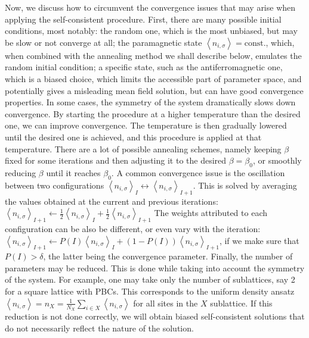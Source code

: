 Now, we discuss how to circumvent the convergence issues that may arise when applying the self-consistent procedure.
First, there are many possible initial conditions, most notably: the random one, which is the most unbiased, but may be slow or not converge at all; the paramagnetic state $\left\langle n_{i,\sigma} \right\rangle = \text{const.}$, which, when combined with the annealing method we shall describe below, emulates the random initial condition; a specific state, such as the antiferromagnetic one, which is a biased choice, which limits the accessible part of parameter space, and potentially gives a misleading mean field solution, but can have good convergence properties.
In some cases, the symmetry of the system dramatically slows down convergence.
By starting the procedure at a higher temperature than the desired one, we can improve convergence.
The temperature is then gradually lowered until the desired one is achieved, and this procedure is applied at that temperature.
There are a lot of possible annealing schemes, namely keeping $\beta$ fixed for some iterations and then adjusting it to the desired $\beta = \beta_0$, or smoothly reducing $\beta$ until it reaches $\beta_0$.
A common convergence issue is the oscillation between two configurations $\left\langle n_{i,\sigma}\right\rangle_I \leftrightarrow \left\langle n_{i,\sigma}\right\rangle_{I+1}$.
This is solved by averaging the values obtained at the current and previous iterations: $\left\langle n_{i,\sigma}\right\rangle_{I+1} \leftarrow \frac{1}{2} \left\langle n_{i,\sigma}\right\rangle_I + \frac{1}{2} \left\langle n_{i,\sigma}\right\rangle_{I+1}$
The weights attributed to each configuration can be also be different, or even vary with the iteration: $\left\langle n_{i,\sigma}\right\rangle_{I+1} \leftarrow P(I) \left\langle n_{i,\sigma}\right\rangle_I + (1 - P(I) ) \left\langle n_{i,\sigma}\right\rangle_{I+1}$, if we make sure that $P(I) > \delta$, the latter being the convergence parameter.
Finally, the number of parameters may be reduced.
This is done while taking into account the symmetry of the system.
For example, one may take only the number of sublattices, say 2 for a square lattice with \acp{PBC}.
This corresponds to the uniform density ansatz $\left\langle n_{i,\sigma} \right\rangle = n_X = \frac{1}{N_X} \sum_{i \in X} \left\langle n_{i,\sigma} \right\rangle$ for all sites in the $X$ sublattice.
If this reduction is not done correctly, we will obtain biased self-consistent solutions that do not necessarily reflect the nature of the solution.